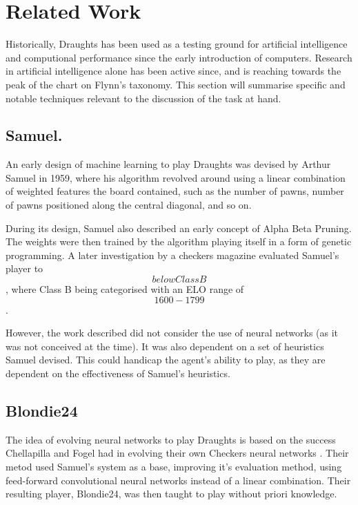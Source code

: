 \documentclass[12pt,a4paper]{article}
\begin{document}
\section{Related Work}
    Historically, Draughts has been used as a testing ground for artificial intelligence and computional performance since the early introduction of computers. Research in artificial intelligence alone has been active since, and is reaching towards the peak of the chart on Flynn's taxonomy. This section will summarise specific and notable techniques relevant to the discussion of the task at hand.

    \subsection{Samuel.}
        An early design of machine learning to play Draughts was devised by Arthur Samuel in 1959\cite{samuel_studies_2000}, where his algorithm revolved around using a linear combination of weighted features the board contained, such as the number of pawns, number of pawns positioned along the central diagonal, and so on. 

        During its design, Samuel also described an early concept of Alpha Beta Pruning. The weights were then trained by the algorithm playing itself in a form of genetic programming. A later investigation by a checkers magazine evaluated Samuel's player to \[below Class B\],\cite{schaeffer_one_1997, fogel_evolving_2000} where Class B being categorised with an ELO range of \[1600-1799\]. 

        However, the work described did not consider the use of neural networks (as it was not conceived at the time). It was also dependent on a set of heuristics Samuel devised. This could handicap the agent's ability to play, as they are dependent on the effectiveness of Samuel's heuristics. 

    \subsection{Blondie24}

        The idea of evolving neural networks to play Draughts is based on the success Chellapilla and Fogel had in evolving their own Checkers neural networks \cite{chellapilla_evolving_1999}. Their metod used Samuel's system as a base, improving it's evaluation method, using feed-forward convolutional neural networks instead of a linear combination. Their resulting player, Blondie24, was then taught to play without priori knowledge.
\end{document}
